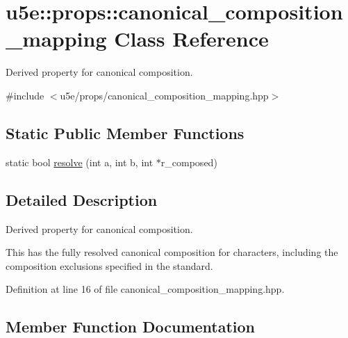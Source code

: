 \hypertarget{classu5e_1_1props_1_1canonical__composition__mapping}{}\section{u5e\+:\+:props\+:\+:canonical\+\_\+composition\+\_\+mapping Class Reference}
\label{classu5e_1_1props_1_1canonical__composition__mapping}


Derived property for canonical composition.  




{\ttfamily \#include $<$u5e/props/canonical\+\_\+composition\+\_\+mapping.\+hpp$>$}

\subsection*{Static Public Member Functions}
\begin{DoxyCompactItemize}
\item 
static bool \hyperlink{classu5e_1_1props_1_1canonical__composition__mapping_a38f0192df16f4d1ed768c4789d1cbb48}{resolve} (int a, int b, int $\ast$r\+\_\+composed)
\end{DoxyCompactItemize}


\subsection{Detailed Description}
Derived property for canonical composition. 

This has the fully resolved canonical composition for characters, including the composition exclusions specified in the standard. 

Definition at line 16 of file canonical\+\_\+composition\+\_\+mapping.\+hpp.



\subsection{Member Function Documentation}
